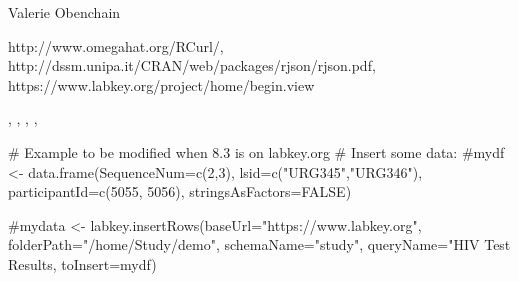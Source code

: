 \documentclass{article}
\begin{document}
\begin{Author}\relax
Valerie Obenchain
\end{Author}
\begin{References}\relax
http://www.omegahat.org/RCurl/,\\ 
http://dssm.unipa.it/CRAN/web/packages/rjson/rjson.pdf,\\
https://www.labkey.org/project/home/begin.view
\end{References}
\begin{SeeAlso}\relax
{}, , , 
, 
\end{SeeAlso}
\begin{Examples}
\begin{ExampleCode}
# Example to be modified when 8.3 is on labkey.org
# Insert some data:
#mydf <- data.frame(SequenceNum=c(2,3), lsid=c("URG345","URG346"), participantId=c(5055, 5056), stringsAsFactors=FALSE)

#mydata <- labkey.insertRows(baseUrl="https://www.labkey.org", folderPath="/home/Study/demo", schemaName="study", queryName="HIV Test Results, toInsert=mydf)


\end{ExampleCode}
\end{Examples}
\end{document}
